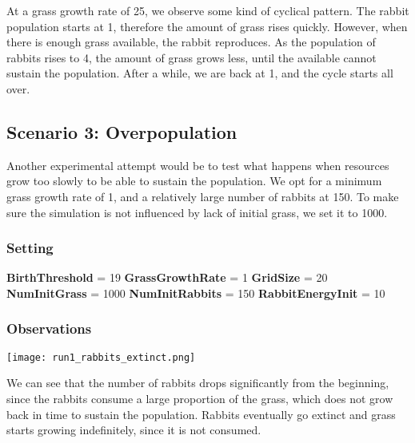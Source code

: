 \documentclass[11pt]{article}
\begin{document}
At a grass growth rate of 25, we observe some kind of cyclical pattern. The rabbit population starts at 1, therefore the amount of grass rises quickly. However, when there is enough grass available, the rabbit reproduces. As the population of rabbits rises to 4, the amount of grass grows less, until the available cannot sustain the population. After a while, we are back at 1, and the cycle starts all over. 

\subsection{Scenario 3: Overpopulation}
Another experimental attempt would be to test what happens when resources grow too slowly to be able to sustain the population. We opt for a minimum grass growth rate of 1, and a relatively large number of rabbits at 150. To make sure the simulation is not influenced by lack of initial grass, we set it to 1000.

\begin{multicols}{2}

\subsubsection{Setting}
\textbf{BirthThreshold} = 19 \newline
\textbf{GrassGrowthRate} = 1 \newline
\textbf{GridSize} = 20 \newline
\textbf{NumInitGrass} = 1000 \newline
\textbf{NumInitRabbits} = 150  \newline
\textbf{RabbitEnergyInit} = 10 \newline

\subsubsection{Observations}
\texttt{[image: run1\_rabbits\_extinct.png]}

\end{multicols}

We can see that the number of rabbits drops significantly from the beginning, since the rabbits consume a large proportion of the grass, which does not grow back in time to sustain the population. Rabbits eventually go extinct and grass starts growing indefinitely, since it is not consumed.
\end{document}
